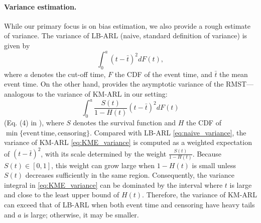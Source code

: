 \documentclass{article}
\theoremstyle{plain}
\theoremstyle{definition}
\theoremstyle{remark}
\begin{document}

\paragraph{Variance estimation.}
While our primary focus is on bias estimation, we also provide a rough estimate of variance.
The variance of LB-ARL (naive, standard definition of variance) is given by
\begin{equation}
    \int_0^a (t - \bar{t})^2  dF(t),
    \label{eq:naive_variance}
\end{equation}
where $a$ denotes the cut-off time, $F$ the CDF of the event time, and $\bar{t}$ the mean event time.
On the other hand, \citet{akritas2000central} provides the asymptotic variance of the RMST—analogous to the variance of KM-ARL in our setting:
\begin{equation}
    \int_0^a \frac{S(t)}{1 - H(t)} (t - \bar{t})^2  dF(t)    
    \label{eq:KME_variance}
\end{equation}
(Eq. (4) in \citep{akritas2000central}), where $S$ denotes the survival function and $H$ the CDF of $\min \{\mathrm{event\,time}, \mathrm{censoring} \}$.
Compared with LB-ARL \eqref{eq:naive_variance}, the variance of KM-ARL \eqref{eq:KME_variance} is computed as a weighted expectation of $(t - \bar{t})^2$, with its scale determined by the weight $\frac{S(t)}{1 - H(t)}$.
Because $S(t) \in [0, 1]$, this weight can grow large when $1-H(t)$ is small unless $S(t)$ decreases sufficiently in the same region. Consequently, the variance integral in \eqref{eq:KME_variance} can be dominated by the interval where $t$ is large and close to the least upper bound of $H(t)$. Therefore, the variance of KM-ARL can exceed that of LB-ARL when both event time and censoring have heavy tails and $a$ is large; otherwise, it may be smaller.
\end{document}
